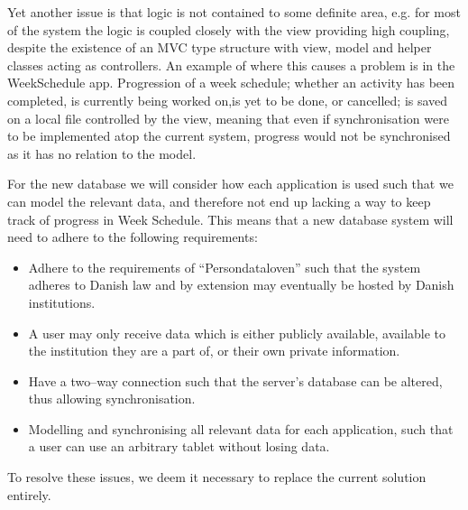 Yet another issue is that logic is not contained to some definite area, e.g. for most of the system the logic is coupled closely with the view providing high coupling, despite the existence of an MVC type structure with view, model and helper classes acting as controllers.
An example of where this causes a problem is in the WeekSchedule app.
Progression of a week schedule; whether an activity has been completed, is currently being worked on,is yet to be done, or cancelled; is saved on a local file controlled by the view, meaning that even if synchronisation were to be implemented atop the current system, progress would not be synchronised as it has no relation to the model.

For the new database we will consider how each application is used such that we can model the relevant data, and therefore not end up lacking a way to keep track of progress in Week Schedule.
This means that a new database system will need to adhere to the following requirements:
\begin{itemize}
	\item Adhere to the requirements of ``Persondataloven'' such that the system adheres to Danish law and by extension may eventually be hosted by Danish institutions.
	\item A user may only receive data which is either publicly available, available to the institution they are a part of, or their own private information.
	\item Have a two--way connection such that the server's database can be altered, thus allowing synchronisation.
	\item Modelling and synchronising all relevant data for each application, such that a user can use an arbitrary tablet without losing data.
\end{itemize}
To resolve these issues, we deem it necessary to replace the current solution entirely.

